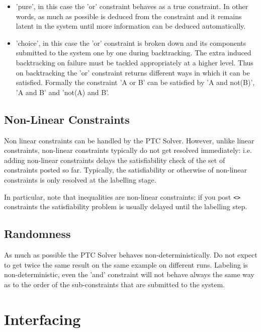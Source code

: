\documentclass{article}
\begin{document}
\begin{itemize}
\item 'pure', in this case the 'or' constraint behaves as a true constraint. In other
words, as much as possible is deduced from the constraint and it
remains latent in the system until more information can be deduced
automatically.

\item 'choice', in this case the 'or' constraint is broken down and its components
submitted to the system one by one during backtracking. The extra
induced backtracking on failure must be tackled appropriately at a
higher level. Thus on backtracking the 'or' constraint returns
different ways in which it can be satisfied. Formally the
constraint 'A or B' can be satisfied by 'A and not(B)', 'A and B'
and 'not(A) and B'.
\end{itemize}

\subsection{Non-Linear Constraints}
Non linear constraints can be handled by the PTC Solver. However, unlike linear constraints, non-linear constraints typically do not get resolved immediately:
 i.e. adding non-linear constraints delays the satisfiability check of the set of constraints posted so far. Typically, the satisfiability or otherwise of non-linear constraints is only resolved at the labelling stage. 
 
In particular, note that inequalities are non-linear constraints: if you post \texttt{<>} constraints the satisfiability problem is usually delayed until the labelling step.   

\subsection{Randomness}

As much as possible the PTC Solver behaves non-deterministically. Do not expect
to get twice the same result on the same example on different runs. Labeling is non-deterministic, even the 'and' constraint will not
behave always the same way as to the order of the sub-constraints that are submitted to the system.

\section{Interfacing}
\end{document}
